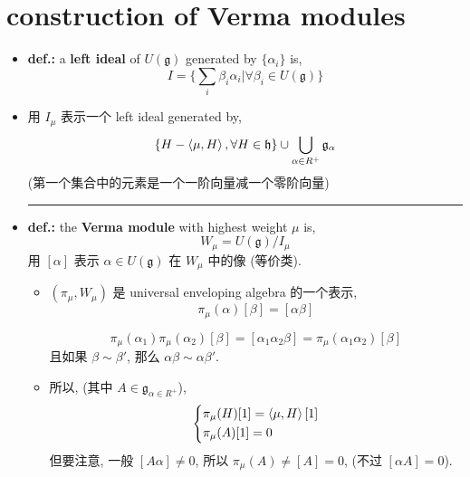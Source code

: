 \section{construction of Verma modules}
\begin{itemize}
	\item \textbf{def.:} a \textbf{left ideal} of $U(\mathfrak{g})$ generated by $\{\alpha_i\}$ is,
	\begin{equation}
		I = \Big\{ \sum_i \beta_i \alpha_i \Big| \forall \beta_i \in U(\mathfrak{g}) \Big\}
	\end{equation}
	
	\item 用 $I_\mu$ 表示一个 left ideal generated by,
	\begin{equation} \label{8.5.2}
		\{H - \braket{\mu, H}, \forall H \in \mathfrak{h}\} \cup \bigcup_{\alpha \in R^+} \mathfrak{g}_\alpha
	\end{equation}
	(第一个集合中的元素是一个一阶向量减一个零阶向量)
	
	\noindent\rule[0.5ex]{\linewidth}{0.5pt} %
	
	\item \textbf{def.:} the \textbf{Verma module} with highest weight $\mu$ is,
	\begin{equation}
		W_\mu = U(\mathfrak{g}) / I_\mu
	\end{equation}
	用 $[\alpha]$ 表示 $\alpha \in U(\mathfrak{g})$ 在 $W_\mu$ 中的像 (等价类).
	\begin{itemize}
		\item $(\pi_\mu, W_\mu)$ 是 universal enveloping algebra 的一个表示,
		\begin{equation}
			\pi_\mu(\alpha) [\beta] = [\alpha \beta]
		\end{equation}
		
		\begin{tcolorbox}[title=proof:]
			\begin{equation}
				\pi_\mu(\alpha_1) \pi_\mu(\alpha_2) [\beta] = [\alpha_1 \alpha_2 \beta] = \pi_\mu(\alpha_1 \alpha_2) [\beta]
			\end{equation}
			且如果 $\beta \sim \beta'$, 那么 $\alpha \beta \sim \alpha \beta'$.
		\end{tcolorbox}
		
		\item 所以, (其中 $A \in \mathfrak{g}_{\alpha \in R^+}$),
		\begin{equation}
			\begin{dcases} \label{8.5.6}
				\pi_\mu(H) [1] = \braket{\mu, H} [1] \\
				\pi_\mu(A) [1] = 0
			\end{dcases}
		\end{equation}
		但要注意, 一般 $[A \alpha] \neq 0$, 所以 $\pi_\mu(A) \neq [A] = 0$, (不过 $[\alpha A] = 0$).
	\end{itemize}
	

\end{itemize}
